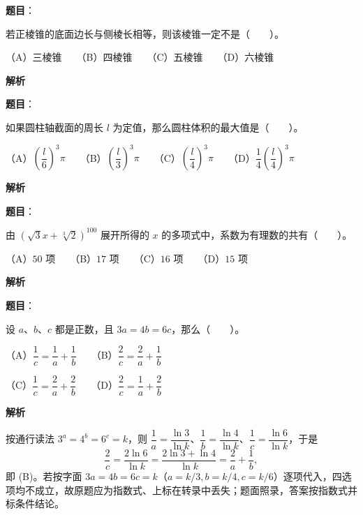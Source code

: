 \begin{answer}

\textbf{题目}：

若正棱锥的底面边长与侧棱长相等，则该棱锥一定不是\mbox{（　　）}。

（A）三棱锥　　（B）四棱锥　　（C）五棱锥　　（D）六棱锥

\textbf{解析}


\end{answer}
\begin{answer}

\textbf{题目}：

如果圆柱轴截面的周长 $l$ 为定值，那么圆柱体积的最大值是\mbox{（　　）}。

（A）$\left(\dfrac{l}{6}\right)^3\pi$　　（B）$\left(\dfrac{l}{3}\right)^3\pi$　　（C）$\left(\dfrac{l}{4}\right)^3\pi$　　（D）$\dfrac14\left(\dfrac{l}{4}\right)^3\pi$

\textbf{解析}


\end{answer}
\begin{answer}

\textbf{题目}：

由 $(\sqrt3x+\sqrt[3]2)^{100}$ 展开所得的 $x$ 的多项式中，系数为有理数的共有\mbox{（　　）}。

（A）$50$ 项　　（B）$17$ 项　　（C）$16$ 项　　（D）$15$ 项

\textbf{解析}


\end{answer}
\begin{answer}

\textbf{题目}：

设 $a\text{、}b\text{、}c$ 都是正数，且 $3a=4b=6c$，那么\mbox{（　　）}。

（A）$\dfrac1c=\dfrac1a+\dfrac1b$　　（B）$\dfrac2c=\dfrac2a+\dfrac1b$\par\vspace*{3pt}

（C）$\dfrac1c=\dfrac2a+\dfrac2b$　　（D）$\dfrac2c=\dfrac1a+\dfrac2b$

\textbf{解析}

按通行读法 \(3^a=4^b=6^c=k\)，则 \(\dfrac1a=\dfrac{\ln3}{\ln k}\)、\(\dfrac1b=\dfrac{\ln4}{\ln k}\)、\(\dfrac1c=\dfrac{\ln6}{\ln k}\)，于是
\nopagebreak[4]
\[
\dfrac2c=\dfrac{2\ln6}{\ln k}=\dfrac{2\ln3+\ln4}{\ln k}=\dfrac2a+\dfrac1b,
\]
即 (B)。若按字面 \(3a=4b=6c=k\)（\(a=k/3,b=k/4,c=k/6\)）逐项代入，四选项均不成立，故原题应为指数式、上标在转录中丢失；题面照录，答案按指数式并标条件结论。


\end{answer}
